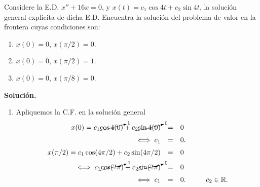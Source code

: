 \documentclass{beamer}
\begin{document}
\begin{frame}[t]
	\begin{example}
		Considere la E.D. \(x'' +16x=0\), y \(x(t) = c_1 \cos 4t+c_2 \sin 4t\), la solución general explícita de dicha E.D.
		Encuentra la solución del problema de valor en la frontera cuyas condiciones son:
		\begin{enumerate}
			\item \(x(0) =0\), \(x(\pi /2) =0\).
			\item \(x(0) =0\), \(x(\pi /2) =1\).
			\item \(x(0) =0\), \(x(\pi /8) =0\).
		\end{enumerate}
		\textbf{Solución.} 
		\begin{enumerate}
			\item Apliquemos la C.F. en la solución general
		\[
			\begin{array}{rcl}
				x(0) = c_1 \cancelto{1}{\cos 4(0)} +c_2 \cancelto{0}{\sin 4(0)} & = & 0 \\[2mm]
				\iff c_1 & = & 0.\\[2mm]
				x(\pi /2) = c_1 \cos (4 \pi /2) + c_2 \sin (4 \pi /2) & = & 0 \\[2mm]
				\iff c_1 \cancelto{1}{\cos (2 \pi)} + c_2 \cancelto{0}{\sin (2 \pi)} & = & 0 \\[2mm]
				\iff c_1 & = & 0. \hspace{1cm} c_2 \in \mathbb{R}.
			\end{array}
		\]
		\end{enumerate}
	\end{example}
\end{frame}
\end{document}
